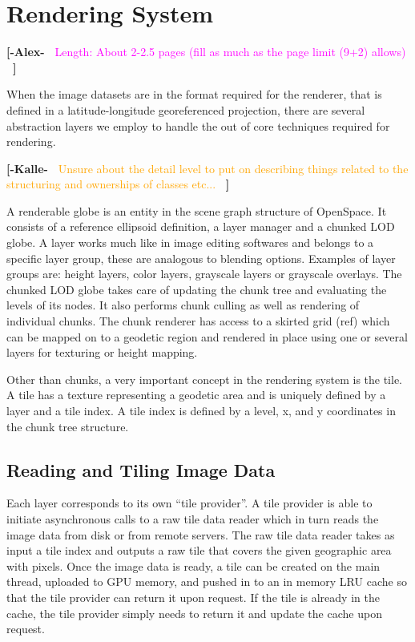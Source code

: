 \documentclass[journal]{vgtc}                %
\newcommand{\kallecomment}[1]{\textbf{[-Kalle-~}
    \textcolor{orange}{#1}
    \textbf{~]}}
\newcommand{\alexcomment}[1]{\textbf{[-Alex-~}
    \textcolor{magenta}{#1}
    \textbf{~]}}
\begin{document}
\section{Rendering System} \label{sec:renderingsystem}

\alexcomment{Length: About 2-2.5 pages (fill as much as the page limit (9+2) allows)}


When the image datasets are in the format required for the renderer, that is defined in a latitude-longitude georeferenced projection, there are several abstraction layers we employ to handle the out of core techniques required for rendering.

\kallecomment{Unsure about the detail level to put on describing things related to the structuring and ownerships of classes etc...}

A renderable globe is an entity in the scene graph structure of OpenSpace.
It consists of a reference ellipsoid definition, a layer manager and a chunked LOD globe.
A layer works much like in image editing softwares and belongs to a specific layer group, these are analogous to blending options.
Examples of layer groups are: height layers, color layers, grayscale layers or grayscale overlays.
The chunked LOD globe takes care of updating the chunk tree and evaluating the levels of its nodes.
It also performs chunk culling as well as rendering of individual chunks.
The chunk renderer has access to a skirted grid (ref) which can be mapped on to a geodetic region and rendered in place using one or several layers for texturing or height mapping.

Other than chunks, a very important concept in the rendering system is the tile.
A tile has a texture representing a geodetic area and is uniquely defined by a layer and a tile index.
A tile index is defined by a level, x, and y coordinates in the chunk tree structure.

\subsection{Reading and Tiling Image Data}

Each layer corresponds to its own ``tile provider''.
A tile provider is able to initiate asynchronous calls to a raw tile data reader which in turn reads the image data from disk or from remote servers.
The raw tile data reader takes as input a tile index and outputs a raw tile that covers the given geographic area with pixels.
Once the image data is ready, a tile can be created on the main thread, uploaded to GPU memory, and pushed in to an in memory LRU cache so that the tile provider can return it upon request.
If the tile is already in the cache, the tile provider simply needs to return it and update the cache upon request.
\end{document}
